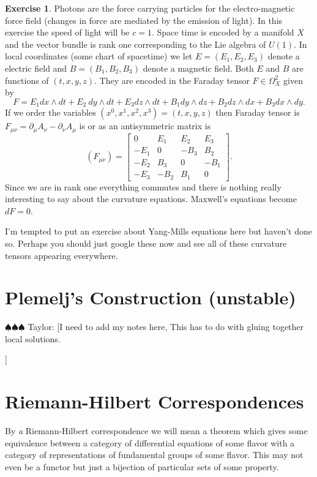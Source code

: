 \documentclass[12pt]{book}
\newcommand{\taylor}[1]{{\color{blue} \sf $\spadesuit\spadesuit\spadesuit$ Taylor: [#1]}}
\numberwithin{equation}{section}
\theoremstyle{definition}
\newtheorem{exercise}[theorem]{Exercise}
\theoremstyle{remark}
\begin{document}
\begin{exercise}
	Photons are the force carrying particles for the electro-magnetic force field (changes in force are mediated by the emission of light). 
	In this exercise the speed of light will be $c=1$.
	Space time is encoded by a manifold $X$ and the vector bundle is rank one corresponding to the Lie algebra of $U(1)$. 
	In local coordinates (some chart of spacetime) we let $E=(E_1,E_2,E_3)$ denote a electric field and $B=(B_1,B_2,B_3)$ denote a magnetic field. 
	Both $E$ and $B$ are functions of $(t,x,y,z)$.
	They are encoded in the Faraday tensor $F\in \Omega^2_X$ given by 
	$$F= E_1dx \wedge dt + E_2\ dy \wedge dt + E_3 dz \wedge dt + B_1 dy \wedge dz + B_2 dz \wedge dx + B_3 dx \wedge dy.$$
	If we order the variables $(x^0,x^1,x^2,x^3)=(t,x,y,z)$ then Faraday tensor is $F_{\mu\nu} = \partial_{\mu}A_{\nu}-\partial_{\nu}A_{\mu}$ is  or as an antisymmetric matrix is
	$$(F_{\mu\nu})=\begin{bmatrix}
	0     &  E_1 &  E_2 &  E_3 \\
	-E_1 &  0     & -B_3   &  B_2    \\
	-E_2 &  B_3  &  0     & -B_1  \\
	-E_3 & -B_2   &  B_1  &  0
	\end{bmatrix}.$$
	Since we are in rank one everything commutes and there is nothing really interesting to say about the curvature equations. 
	Maxwell's equations become $dF=0$.
\end{exercise}

I'm tempted to put an exercise about Yang-Mills equations here but haven't done so. 
Perhaps you should just google these now and see all of these curvature tensors appearing everywhere.

\section{Plemelj's Construction (unstable)}

\taylor{I need to add my notes here,
This has to do with gluing together local solutions.

}

\section{Riemann-Hilbert Correspondences}\label{S:rhcs}
By \emph{a} Riemann-Hilbert correspondence we will mean a theorem which gives some equivalence between a category of differential equations of some flavor with a category of representations of fundamental groups of some flavor. 
This may not even be a functor but just a bijection of particular sets of some property. 
\end{document}
